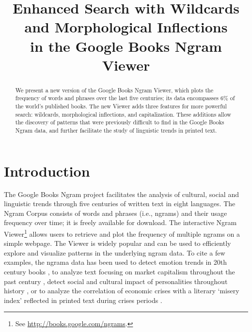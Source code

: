 \documentclass[11pt,a4paper]{article}
\title{Enhanced Search with Wildcards and Morphological Inflections\\in the Google Books Ngram Viewer}
\date{}
\begin{document}
\maketitle

\begin{abstract}

We present a new version of the Google Books Ngram Viewer, which plots
the frequency of words and phrases over the last five
centuries; its data encompasses 6\% of the world's published books.
The new Viewer adds three features for more powerful search: wildcards,
morphological inflections, and capitalization. These additions allow
the discovery of patterns that were previously difficult to find in the Google Books Ngram data,
and further facilitate the study of linguistic trends in printed text.

\end{abstract}

\section{Introduction}

The Google Books Ngram project facilitates the analysis of cultural, social and linguistic trends through five centuries of written text in eight languages. The Ngram Corpus \cite{culturomics,lin2012syntactic} consists of words and phrases (i.e., ngrams) and their usage frequency over time; it is freely available for download. The interactive Ngram Viewer\footnote{See \url{http://books.google.com/ngrams}.} allows users to retrieve and plot the frequency of multiple ngrams on a simple webpage. The Viewer is widely popular and can be used to efficiently explore and visualize patterns in the underlying ngram data. To cite a few examples, the ngrama data has been used to detect emotion trends in 20th century books \cite{acerbi.etal.2013}, to analyze text focusing on market capitalism throughout the past century \cite{Schulz2013}, detect social and cultural impact of personalities throughout history \cite{skiena.ward.2013}, or to analyze the correlation of economic crises with a literary `misery index' reflected in printed text during crises periods \cite{bentley.et.al.2014}.
\end{document}
